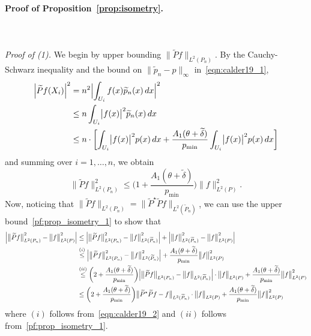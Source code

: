 \documentclass{article}
\newcommand{\1}{\mathbf{1}}
\newcommand{\Leb}{L}
\newcommand{\wt}[1]{\widetilde{#1}}
\theoremstyle{alden}
\theoremstyle{aldenthm}
\theoremstyle{definition}
\theoremstyle{remark}
\begin{document}
\paragraph{Proof of Proposition~\ref{prop:isometry}.}
\mbox{}\\
\mbox{}\\
\textit{Proof of (1).}
We begin by upper bounding $\bigl\|\wt{P}f\bigr\|_{\Leb^2(P_n)}$. By the Cauchy-Schwarz inequality and the bound on $\|\wt{p}_n - p\|_{\infty}$ in~\eqref{eqn:calder19_1},
\begin{align*}
\Bigl|\wt{P}f(X_i)\Bigr|^2 & = n^2 \Bigl|\int_{U_i} f(x) \wt{p}_n(x) \,dx\Bigr|^2 \\
& \leq n \int_{U_i} \bigl|f(x)\bigr|^2 \wt{p}_n(x) \,dx \\
& \leq n \cdot \biggl[\int_{U_i} \bigl|f(x)\bigr|^2 p(x) \,dx + \frac{A_1(\theta + \wt{\delta})}{p_{\min}} \int_{U_i} \bigl|f(x)\bigr|^2 p(x) \,dx\biggr]
\end{align*}
and summing over $i = 1,\ldots,n$, we obtain
\begin{equation}
\label{pf:prop_isometry_1}
\bigl\|\wt{P}f\bigr\|_{\Leb^2(P_n)}^2 \leq \biggl(1 + \frac{A_1(\theta + \wt{\delta})}{p_{\min}}\biggr) \bigl\|f\bigr\|_{\Leb^2(P)}^2.
\end{equation}
Now, noticing that $\bigl\|\wt{P}f\bigr\|_{\Leb^2(P_n)} = \bigl\|\wt{P}^{\star}\wt{P}f\bigr\|_{\Leb^2(\wt{P}_n)}$, we can use the upper bound~\eqref{pf:prop_isometry_1} to show that
\begin{align}
\Bigl|\bigl\|\wt{P}f\bigr\|_{\Leb^2(P_n)}^2 - \bigl\|f\bigr\|_{\Leb^2(P)}^2\Bigr| & \leq \Bigl|\bigl\|\wt{P}f\bigr\|_{\Leb^2(P_n)}^2 - \bigl\|f\bigr\|_{\Leb^2(\wt{P}_n)}^2\Bigr| + \Bigl|\bigl\|f\bigr\|_{\Leb^2(\wt{P}_n)}^2 - \bigl\|f\bigr\|_{\Leb^2(P)}^2\Bigr| \nonumber \\
& \overset{(i)}{\leq} \Bigl|\bigl\|\wt{P}f\bigr\|_{\Leb^2(P_n)}^2 - \bigl\|f\bigr\|_{\Leb^2(\wt{P}_n)}^2\Bigr|  + \frac{A_1(\theta + \wt{\delta})}{p_{\min}} \bigl\|f\bigr\|_{\Leb^2(P)}^2 \\
& \overset{(ii)}{\leq} \biggl(2 + \frac{A_1(\theta + \wt{\delta})}{p_{\min}}\biggr) \Bigl|\bigl\|\wt{P}f\bigr\|_{\Leb^2(P_n)} - \bigl\|f\bigr\|_{\Leb^2(\wt{P}_n)}\Bigr| \cdot \bigl\|f\bigr\|_{\Leb^2(P)} + \frac{A_1(\theta + \wt{\delta})}{p_{\min}} \bigl\|f\bigr\|_{\Leb^2(P)}^2 \nonumber \\
& \leq \biggl(2 + \frac{A_1(\theta + \wt{\delta})}{p_{\min}}\biggr) \bigl\|\wt{P}^{\star}\wt{P}f - f\bigr\|_{\Leb^2(\wt{P}_n)} \cdot \bigl\|f\bigr\|_{\Leb^2(P)} + \frac{A_1(\theta + \wt{\delta})}{p_{\min}} \bigl\|f\bigr\|_{\Leb^2(P)}^2 \label{pf:prop_isometry_2}
\end{align}
where $(i)$ follows from~\eqref{eqn:calder19_2} and $(ii)$ follows from~\eqref{pf:prop_isometry_1}. 
\end{document}
